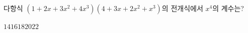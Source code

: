 다항식 $(1+2x+3x^2+4x^3)(4+3x+2x^2+x^3)$의 전개식에서 $x^4$의 계수는?
\begin{choices32}{$14$}{$16$}{$18$}{$20$}{$22$}\end{choices32}
